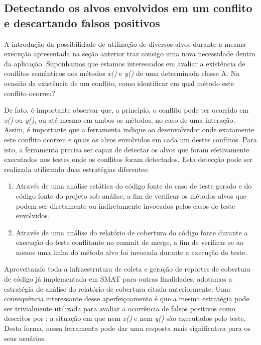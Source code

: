 \documentclass[12pt]{article}
\begin{document}
\subsection{Detectando os alvos envolvidos em um conflito e descartando falsos positivos}
A introdução da possibilidade de utilização de diversos alvos durante a mesma execução apresentada na seção anterior traz consigo uma nova necessidade dentro da aplicação. Suponhamos que estamos interessados em avaliar a existência de conflitos semânticos nos métodos \textit{x()} e \textit{y()} de uma determinada classe A. Na ocasião da existência de um conflito, como identificar em qual método este conflito ocorreu?

De fato, é importante observar que, a princípio, o conflito pode ter ocorrido em \textit{x()} ou \textit{y()}, ou até mesmo em ambos os métodos, no caso de uma interação. Assim, é importante que a ferramenta indique ao desenvolvedor onde exatamente este conflito ocorreu e quais os alvos envolvidos em cada um destes conflitos. Para isto, a ferramenta precisa ser capaz de detectar os alvos que foram efetivamente executados nos testes onde os conflitos foram detectados. Esta detecção pode ser realizada utilizando duas estratégias diferentes:

\begin{enumerate}
    \item Através de uma análise estática do código fonte do caso de teste gerado e do código fonte do projeto sob análise, a fim de verificar os métodos alvos que podem ser diretamente ou indiretamente invocados pelos casos de teste envolvidos.
    \item Através de uma análise do relatório de cobertura do código fonte durante a execução do teste conflitante no commit de merge, a fim de verificar se ao menos uma linha do método alvo foi invocada durante a execução do teste.
\end{enumerate}

Aproveitando toda a infraestrutura de coleta e geração de reportes de cobertura de código já implementada em SMAT para outras finalidades, adotamos a estratégia de análise do relatório de cobertura citada anteriormente. Uma consequência interessante desse aperfeiçoamento é que a mesma estratégia pode ser trivialmente utilizada para avaliar a ocorrência de falsos positivos como descritos por \cite{leuson:tese}: a situação em que nem \textit{x()} e nem \textit{y()} são executados pelo teste. Desta forma, nossa ferramenta pode dar uma resposta mais significativa para os seus usuários.
\end{document}
